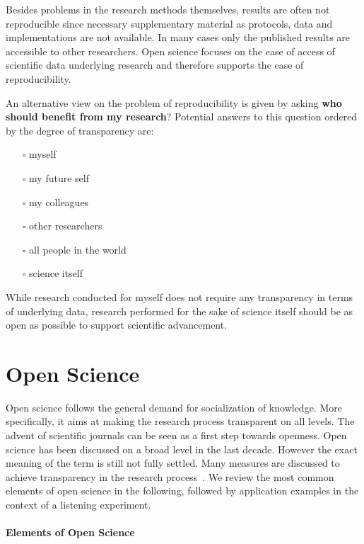 \documentclass[a4paper, 10pt, twocolumn]{article}
\begin{document}
Besides problems in the research methods themselves, results are often not reproducible since 
necessary supplementary material as protocols, data and implementations are not available. In 
many cases only the published results are accessible to other researchers. Open science 
focuses on the ease of access of scientific data underlying research and therefore supports the ease of reproducibility.

An alternative view on the problem of reproducibility is given by asking 
\textbf{who should benefit from my research}? Potential answers to this question ordered by 
the degree of transparency are:
\begin{itemize}
\item[$\square$] myself
\item[$\square$] my future self
\item[$\square$] my colleagues
\item[$\square$] other researchers
\item[$\square$] all people in the world
\item[$\square$] science itself
\end{itemize}
While research conducted for myself does not require any transparency in terms
of underlying data, research performed for the sake of science itself should be
as open as possible to support scientific advancement.


\section*{Open Science} \label{sec:open_science} 

Open science follows the general demand for socialization of knowledge. More specifically, 
it aims at making the research process transparent on all levels. The advent of scientific 
journals can be seen as a first step towards openness. Open science has been discussed on
a broad level in the last decade. However the exact meaning of the term is still not fully 
settled. Many measures are discussed to achieve transparency in the research process~\cite{Pontika15:ACM,Reproducibility15:AMS,Albagli15:Book,Vrana15:MIPRO,Kraker11:TEL}. 
We review the most common elements of open science in the following, followed by application 
examples in the context of a listening experiment.


\paragraph*{Elements of Open Science}
\end{document}
